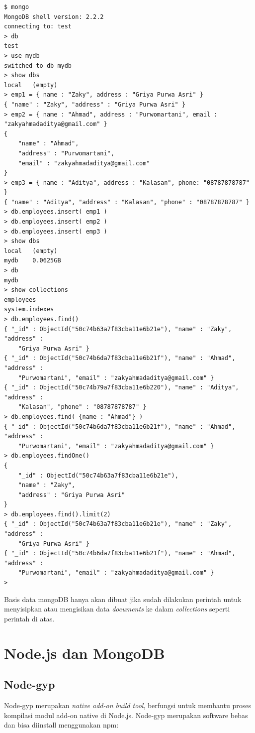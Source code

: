 \lstset{language=bash,caption=Sesi dalam shell mongoDB}
\begin{lstlisting}
$ mongo
MongoDB shell version: 2.2.2
connecting to: test
> db
test
> use mydb
switched to db mydb
> show dbs
local	(empty)
> emp1 = { name : "Zaky", address : "Griya Purwa Asri" }
{ "name" : "Zaky", "address" : "Griya Purwa Asri" }
> emp2 = { name : "Ahmad", address : "Purwomartani", email : "zakyahmadaditya@gmail.com" }
{
	"name" : "Ahmad",
	"address" : "Purwomartani",
	"email" : "zakyahmadaditya@gmail.com"
}
> emp3 = { name : "Aditya", address : "Kalasan", phone: "08787878787" }
{ "name" : "Aditya", "address" : "Kalasan", "phone" : "08787878787" }
> db.employees.insert( emp1 )
> db.employees.insert( emp2 )
> db.employees.insert( emp3 )
> show dbs
local	(empty)
mydb	0.0625GB
> db
mydb
> show collections
employees
system.indexes
> db.employees.find()
{ "_id" : ObjectId("50c74b63a7f83cba11e6b21e"), "name" : "Zaky", "address" : 
	"Griya Purwa Asri" }
{ "_id" : ObjectId("50c74b6da7f83cba11e6b21f"), "name" : "Ahmad", "address" : 
	"Purwomartani", "email" : "zakyahmadaditya@gmail.com" }
{ "_id" : ObjectId("50c74b79a7f83cba11e6b220"), "name" : "Aditya", "address" : 
	"Kalasan", "phone" : "08787878787" }
> db.employees.find( {name : "Ahmad"} )
{ "_id" : ObjectId("50c74b6da7f83cba11e6b21f"), "name" : "Ahmad", "address" : 
	"Purwomartani", "email" : "zakyahmadaditya@gmail.com" }
> db.employees.findOne()
{
	"_id" : ObjectId("50c74b63a7f83cba11e6b21e"),
	"name" : "Zaky",
	"address" : "Griya Purwa Asri"
}
> db.employees.find().limit(2)
{ "_id" : ObjectId("50c74b63a7f83cba11e6b21e"), "name" : "Zaky", "address" : 
	"Griya Purwa Asri" }
{ "_id" : ObjectId("50c74b6da7f83cba11e6b21f"), "name" : "Ahmad", "address" : 
	"Purwomartani", "email" : "zakyahmadaditya@gmail.com" }
> 
\end{lstlisting}

Basis data mongoDB hanya akan dibuat jika sudah dilakukan perintah untuk menyisipkan atau mengisikan data \textit{documents} ke dalam \textit{collections} seperti perintah di atas.

\section{Node.js dan MongoDB}

\subsection{Node-gyp}

Node-gyp merupakan \textit{native add-on build tool}, berfungsi untuk membantu proses kompilasi modul add-on native di Node.js. Node-gyp merupakan software bebas dan bisa diinstall menggunakan npm:

